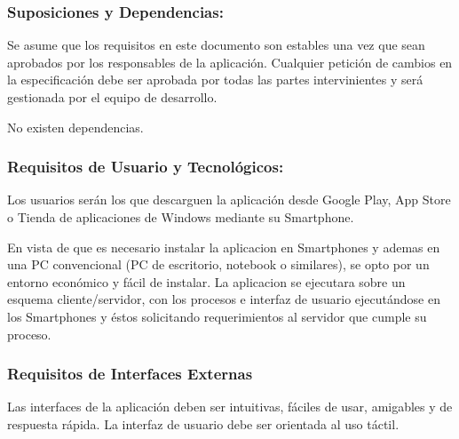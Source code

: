         \subsubsection{Suposiciones y Dependencias:}
        
            
            Se asume que los requisitos en este documento son estables una vez que sean aprobados por los responsables de la aplicación. Cualquier petición de cambios en la especificación debe ser aprobada por todas las partes intervinientes y será gestionada por el equipo de desarrollo.
            
            
            No existen dependencias.
            
          \subsubsection{Requisitos de Usuario y Tecnológicos:}
        
            
            Los usuarios serán los que descarguen la aplicación desde Google Play, App Store o Tienda de aplicaciones de Windows mediante su Smartphone.
            
            
            En vista de que es necesario instalar la aplicacion en Smartphones y ademas en una PC convencional (PC de escritorio, notebook o similares), se opto por un entorno económico y fácil de instalar. La aplicacion se ejecutara sobre un esquema cliente/servidor, con los procesos e interfaz de usuario ejecutándose en los Smartphones y éstos solicitando requerimientos al servidor que cumple su proceso.
            
        \subsubsection{Requisitos de Interfaces Externas}
        
            
            Las interfaces de la aplicación deben ser intuitivas, fáciles de usar, amigables y de respuesta rápida. La interfaz de usuario debe ser orientada al uso táctil.
            
